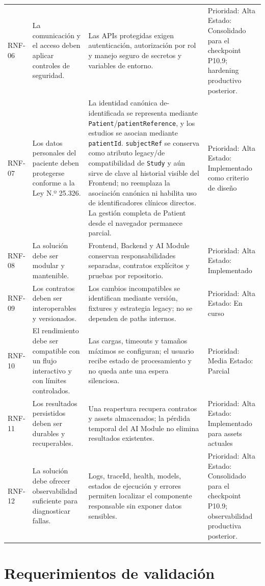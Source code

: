 {\begin{longtable}{>{\raggedright\arraybackslash}p{} >{\raggedright\arraybackslash}p{} >{\raggedright\arraybackslash}p{} >{\raggedright\arraybackslash}p{}}
RNF-06 & La comunicación y el acceso deben aplicar controles de seguridad. & Las APIs protegidas exigen autenticación, autorización por rol y manejo seguro de secretos y variables de entorno. & Prioridad: Alta Estado: Consolidado para el checkpoint P10.9; hardening productivo posterior. \\
RNF-07 & Los datos personales del paciente deben protegerse conforme a la Ley N.º 25.326. & La identidad canónica de-identificada se representa mediante \texttt{Patient}/\texttt{patientReference}, y los estudios se asocian mediante \texttt{patientId}. \texttt{subjectRef} se conserva como atributo legacy/de compatibilidad de \texttt{Study} y aún sirve de clave al historial visible del Frontend; no reemplaza la asociación canónica ni habilita uso de identificadores clínicos directos. La gestión completa de Patient desde el navegador permanece parcial. & Prioridad: Alta Estado: Implementado como criterio de diseño \\
RNF-08 & La solución debe ser modular y mantenible. & Frontend, Backend y AI Module conservan responsabilidades separadas, contratos explícitos y pruebas por repositorio. & Prioridad: Alta Estado: Implementado \\
RNF-09 & Los contratos deben ser interoperables y versionados. & Los cambios incompatibles se identifican mediante versión, fixtures y estrategia legacy; no se dependen de paths internos. & Prioridad: Alta Estado: En curso \\
RNF-10 & El rendimiento debe ser compatible con un flujo interactivo y con límites controlados. & Las cargas, timeouts y tamaños máximos se configuran; el usuario recibe estado de procesamiento y no queda ante una espera silenciosa. & Prioridad: Media Estado: Parcial \\
RNF-11 & Los resultados persistidos deben ser durables y recuperables. & Una reapertura recupera contratos y assets almacenados; la pérdida temporal del AI Module no elimina resultados existentes. & Prioridad: Alta Estado: Implementado para assets actuales \\
RNF-12 & La solución debe ofrecer observabilidad suficiente para diagnosticar fallas. & Logs, traceId, health, models, estados de ejecución y errores permiten localizar el componente responsable sin exponer datos sensibles. & Prioridad: Alta Estado: Consolidado para el checkpoint P10.9; observabilidad productiva posterior. \\
\hline
\end{longtable}
}

\section{Requerimientos de validación}

